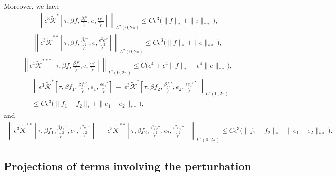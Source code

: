 \documentclass[10pt, reqno]{amsart}
\numberwithin{equation}{section}
\theoremstyle{definition}
\begin{document}
{Moreover, we have
\begin{align*}
\left\|\epsilon^3 \tilde{\mathcal K}^* \left[\tau, \beta f, \frac{\beta {f}'}{\tilde\ell}, e, \frac{\epsilon e'}{\tilde\ell}\right] \right\|_{L^2(0, 2\pi)} \le C \epsilon^3 \big( \|f\|_* + \|e\|_{**} \big),
\end{align*}
\begin{align*}
\left\| \epsilon^3 \tilde{\mathcal K}^{**} \left[\tau, \beta f, \frac{\beta f''}{\tilde\ell^2}, e, \frac{\epsilon^2 e''}{\tilde \ell^2}\right] \right\|_{L^2(0, 2\pi)} \le C \epsilon^3 \big( \|f\|_* + \|e\|_{**} \big),
\end{align*}
\begin{align*}
\left\|\epsilon^4\tilde{\mathcal K}^{***} \left[\tau, \beta f, \frac{\beta {f}'}{\tilde\ell}, e, \frac{\epsilon e'}{\tilde\ell}\right] \right\|_{L^2(0, 2\pi)} \le C \big( \epsilon^4+ \epsilon^4\|f\|_* + \epsilon^4 \|e\|_{**} \big),
\end{align*}
\begin{align*}
& \left\|\epsilon^3 \tilde{\mathcal K}^* \left[\tau, \beta f_1, \frac{\beta {f_1}'}{\tilde\ell}, e_1, \frac{\epsilon e_1'}{\tilde\ell}\right]
\ -\ \epsilon^3\tilde{\mathcal K}^* \left[\tau, \beta f_2, \frac{\beta {f_2}'}{\tilde\ell}, e_2, \frac{\epsilon e_2'}{\tilde\ell}\right]\right\|_{L^2(0, 2\pi)}
\nonumber\\[2mm]
 &
 \le C \epsilon^3 \big(\|f_1- f_2\|_* + \|e_1- e_2\|_{**} \big),
\end{align*}
and
\begin{align*}
\left\|
\epsilon^3 \tilde{\mathcal K}^{**} \left[\tau, \beta f_1, \frac{\beta f_1''}{\tilde\ell^2}, e_1, \frac{\epsilon^2 e_1''}{\tilde \ell^2}\right]
\ -\
\epsilon^3 \tilde{\mathcal K}^{**} \left[\tau, \beta f_2, \frac{\beta f_2''}{\tilde\ell^2}, e_2, \frac{\epsilon^2 e_2''}{\tilde \ell^2}\right]
\right\|_{L^2(0, 2\pi)}
\le
C \epsilon^3 \big(\|f_1- f_2\|_* + \|e_1- e_2\|_{**} \big).
\end{align*}









\medskip
\subsection{ Projections of terms involving the perturbation}\label{Section7.2}\


}
\end{document}
